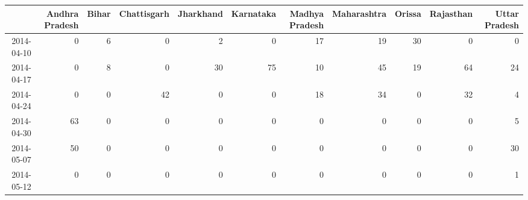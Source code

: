 \begin{tabular}{rrrrrrrrrrr}
  \hline
 & Andhra Pradesh & Bihar & Chattisgarh & Jharkhand & Karnataka & Madhya Pradesh & Maharashtra & Orissa & Rajasthan & Uttar Pradesh \\ 
  \hline
2014-04-10 &   0 &   6 &   0 &   2 &   0 &  17 &  19 &  30 &   0 &   0 \\ 
  2014-04-17 &   0 &   8 &   0 &  30 &  75 &  10 &  45 &  19 &  64 &  24 \\ 
  2014-04-24 &   0 &   0 &  42 &   0 &   0 &  18 &  34 &   0 &  32 &   4 \\ 
  2014-04-30 &  63 &   0 &   0 &   0 &   0 &   0 &   0 &   0 &   0 &   5 \\ 
  2014-05-07 &  50 &   0 &   0 &   0 &   0 &   0 &   0 &   0 &   0 &  30 \\ 
  2014-05-12 &   0 &   0 &   0 &   0 &   0 &   0 &   0 &   0 &   0 &   1 \\ 
   \hline
\end{tabular}

